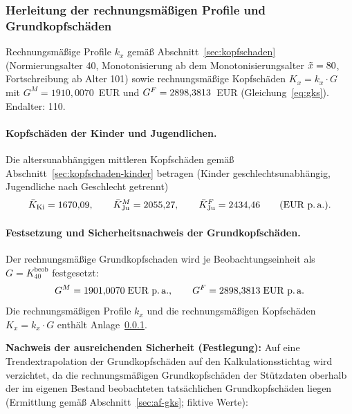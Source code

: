 
\clearpage


\subsubsection{Herleitung der rechnungsmäßigen Profile und Grundkopfschäden}\label{sec:anlage233}

Rechnungsmäßige Profile $k_x$ gemäß Abschnitt~\ref{sec:kopfschaden}
(Normierungsalter 40, Monotonisierung ab dem Monotonisierungsalter
$\tilde{x} = 80$, Fortschreibung ab Alter 101) sowie
rechnungsmäßige Kopfschäden $K_x = k_x\cdot G$ mit
$G^{M} = 1910{,}0070$~EUR und $G^{F} = 2898{,}3813$~EUR
(Gleichung~\eqref{eq:gks}). Endalter: 110.

\paragraph{Kopfschäden der Kinder und Jugendlichen.}
Die altersunabhängigen mittleren Kopfschäden gemäß
Abschnitt~\ref{sec:kopfschaden-kinder} betragen (Kinder
geschlechtsunabhängig, Jugendliche nach Geschlecht getrennt)
\begin{equation}
\bar{K}_{\mathrm{Ki}} = 1670{,}09, \qquad
\bar{K}^{M}_{\mathrm{Ju}} = 2055{,}27, \qquad
\bar{K}^{F}_{\mathrm{Ju}} = 2434{,}46
\qquad\text{(EUR p.\,a.)}.
\label{eq:kkinder}
\end{equation}

\paragraph{Festsetzung und Sicherheitsnachweis der Grundkopfschäden.}
Der rechnungsmäßige Grundkopfschaden wird je Beobachtungseinheit als
$G = K^{\mathrm{beob}}_{40}$ festgesetzt:
\begin{equation}
G^{M} = 1901{,}0070\;\text{EUR p.\,a.},
\qquad
G^{F} = 2898{,}3813\;\text{EUR p.\,a.}
\label{eq:gks}
\end{equation}
Die rechnungsmäßigen Profile $k_x$ und die rechnungsmäßigen
Kopfschäden $K_x = k_x\cdot G$ enthält Anlage~\ref{sec:anlage233}.

\textbf{Nachweis der ausreichenden Sicherheit (Festlegung):} Auf eine
Trendextrapolation der Grundkopfschäden auf den Kalkulationsstichtag
wird verzichtet, da die rechnungsmäßigen Grundkopfschäden der
Stützdaten oberhalb der im eigenen Bestand beobachteten tatsächlichen
Grundkopfschäden liegen (Ermittlung gemäß
Abschnitt~\ref{sec:af-gks}; fiktive Werte):

